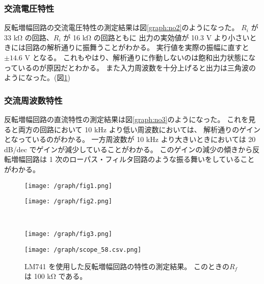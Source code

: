 \documentclass[11pt,dvipdfmx,a4paper]{jsarticle}
\begin{document}
\subsubsection{交流電圧特性}
反転増幅回路の交流電圧特性の測定結果は図\ref{graph:no2}のようになった。
\(R_i\) が 33 k\si{\ohm} の回路、\(R_i\) が 16 k\si{\ohm} の回路ともに
出力の実効値が 10.3 V より小さいときには回路の解析通りに振舞うことがわかる。
実行値を実際の振幅に直すと\(\pm 14.6\) V となる。
これもやはり、解析通りに作動しないのは飽和出力状態になっているのが原因だとわかる。
また入力周波数を十分上げると出力は三角波のようになった。(図\ref{graph:noA})

\subsubsection{交流周波数特性}
反転増幅回路の直流特性の測定結果は図\ref{graph:no3}のようになった。
これを見ると両方の回路において 10 kHz より低い周波数においては、
解析通りのゲインとなっているのがわかる。
一方周波数が 10 kHz より大きいときにおいては 20 dB/dec でゲインが減少していることがわかる。
このゲインの減少の傾きから反転増幅回路は 1 次のローパス・フィルタ回路のような振る舞いをしていることがわかる。

\begin{figure}[H]
	\centering
	\begin{minipage}[t]{0.49\columnwidth}
		\centering
		\texttt{[image: /graph/fig1.png]}
		\label{graph:no1}
	\end{minipage}
	\hfill
	\begin{minipage}[t]{0.49\columnwidth}
		\centering
		\texttt{[image: /graph/fig2.png]}
		\label{graph:no2}
	\end{minipage}\\
	\begin{minipage}[t]{0.49\columnwidth}
		\centering
		\texttt{[image: /graph/fig3.png]}
		\label{graph:no3}
	\end{minipage}
	\hfill
	\begin{minipage}[t]{0.49\columnwidth}
		\centering
		\texttt{[image: /graph/scope\_58.csv.png]}
		\label{graph:noA}
	\end{minipage}
	\caption{LM741 を使用した反転増幅回路の特性の測定結果。
	このときの\(R_f\) は 100 k\si{\ohm} である。}
\end{figure}
\end{document}
